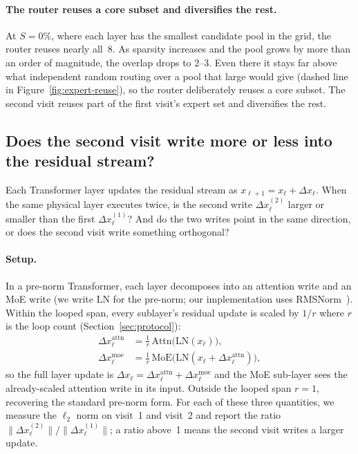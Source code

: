 \documentclass[]{bytedance_seed}
\theoremstyle{definition}
\theoremstyle{remark}
\begin{document}
%
\paragraph{The router reuses a core subset and diversifies the rest.}
At $S{=}0\%$, where each layer has the smallest candidate pool in the grid, the router reuses nearly all~8.
As sparsity increases and the pool grows by more than an order of magnitude, the overlap drops to 2--3.
Even there it stays far above what independent random routing over a pool that large would give (dashed line in Figure~\ref{fig:expert-reuse}), so the router deliberately reuses a core subset.
The second visit reuses part of the first visit's expert set and diversifies the rest.

\subsection{Does the second visit write more or less into the residual stream?}
\label{sec:residual}

%
Each Transformer layer updates the residual stream as $x_{\ell+1} = x_\ell + \Delta x_\ell$.
When the same physical layer executes twice, is the second write $\Delta x_\ell^{(2)}$ larger or smaller than the first $\Delta x_\ell^{(1)}$?
And do the two writes point in the same direction, or does the second visit write something orthogonal?

%
\paragraph{Setup.}
In a pre-norm Transformer, each layer decomposes into an attention write and an MoE write (we write $\mathrm{LN}$ for the pre-norm; our implementation uses RMSNorm~\cite{zhang2019root}).
%
Within the looped span, every sublayer's residual update is scaled by $1/r$ where $r$ is the loop count (Section~\ref{sec:protocol}):
\begin{align}
\Delta x_\ell^{\mathrm{attn}} &= \tfrac{1}{r}\,\mathrm{Attn}\bigl(\mathrm{LN}(x_\ell)\bigr), \label{eq:attn-write} \\
\Delta x_\ell^{\mathrm{moe}} &= \tfrac{1}{r}\,\mathrm{MoE}\bigl(\mathrm{LN}(x_\ell + \Delta x_\ell^{\mathrm{attn}})\bigr), \label{eq:moe-write}
\end{align}
so the full layer update is $\Delta x_\ell = \Delta x_\ell^{\mathrm{attn}} + \Delta x_\ell^{\mathrm{moe}}$ and the MoE sub-layer sees the already-scaled attention write in its input.
Outside the looped span $r = 1$, recovering the standard pre-norm form.
%
For each of these three quantities, we measure the $\ell_2$ norm on visit~1 and visit~2 and report the ratio $\lVert\Delta x_\ell^{(2)}\rVert / \lVert\Delta x_\ell^{(1)}\rVert$; a ratio above~1 means the second visit writes a larger update.
\end{document}
